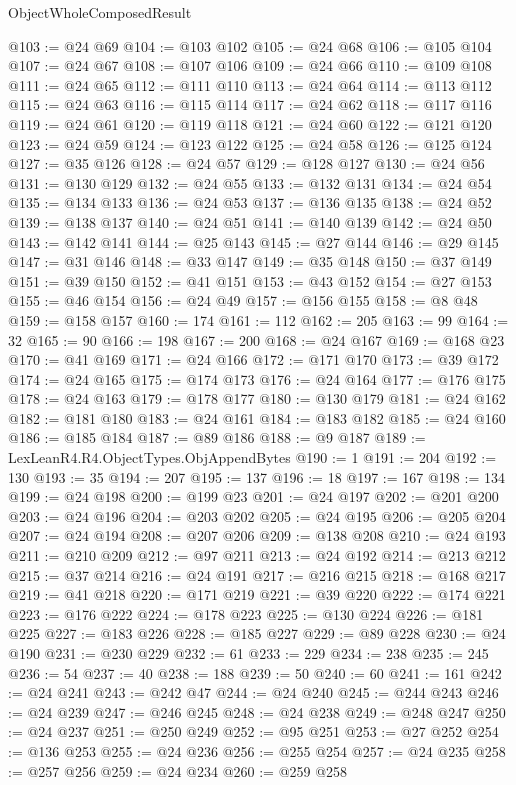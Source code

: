 \begin{lexlean}{ObjectWholeComposedResult}
\begin{coremodule}
@103 := @24 @69
@104 := @103 @102
@105 := @24 @68
@106 := @105 @104
@107 := @24 @67
@108 := @107 @106
@109 := @24 @66
@110 := @109 @108
@111 := @24 @65
@112 := @111 @110
@113 := @24 @64
@114 := @113 @112
@115 := @24 @63
@116 := @115 @114
@117 := @24 @62
@118 := @117 @116
@119 := @24 @61
@120 := @119 @118
@121 := @24 @60
@122 := @121 @120
@123 := @24 @59
@124 := @123 @122
@125 := @24 @58
@126 := @125 @124
@127 := @35 @126
@128 := @24 @57
@129 := @128 @127
@130 := @24 @56
@131 := @130 @129
@132 := @24 @55
@133 := @132 @131
@134 := @24 @54
@135 := @134 @133
@136 := @24 @53
@137 := @136 @135
@138 := @24 @52
@139 := @138 @137
@140 := @24 @51
@141 := @140 @139
@142 := @24 @50
@143 := @142 @141
@144 := @25 @143
@145 := @27 @144
@146 := @29 @145
@147 := @31 @146
@148 := @33 @147
@149 := @35 @148
@150 := @37 @149
@151 := @39 @150
@152 := @41 @151
@153 := @43 @152
@154 := @27 @153
@155 := @46 @154
@156 := @24 @49
@157 := @156 @155
@158 := @8 @48
@159 := @158 @157
@160 := 174
@161 := 112
@162 := 205
@163 := 99
@164 := 32
@165 := 90
@166 := 198
@167 := 200
@168 := @24 @167
@169 := @168 @23
@170 := @41 @169
@171 := @24 @166
@172 := @171 @170
@173 := @39 @172
@174 := @24 @165
@175 := @174 @173
@176 := @24 @164
@177 := @176 @175
@178 := @24 @163
@179 := @178 @177
@180 := @130 @179
@181 := @24 @162
@182 := @181 @180
@183 := @24 @161
@184 := @183 @182
@185 := @24 @160
@186 := @185 @184
@187 := @89 @186
@188 := @9 @187
@189 := LexLeanR4.R4.ObjectTypes.ObjAppendBytes
@190 := 1
@191 := 204
@192 := 130
@193 := 35
@194 := 207
@195 := 137
@196 := 18
@197 := 167
@198 := 134
@199 := @24 @198
@200 := @199 @23
@201 := @24 @197
@202 := @201 @200
@203 := @24 @196
@204 := @203 @202
@205 := @24 @195
@206 := @205 @204
@207 := @24 @194
@208 := @207 @206
@209 := @138 @208
@210 := @24 @193
@211 := @210 @209
@212 := @97 @211
@213 := @24 @192
@214 := @213 @212
@215 := @37 @214
@216 := @24 @191
@217 := @216 @215
@218 := @168 @217
@219 := @41 @218
@220 := @171 @219
@221 := @39 @220
@222 := @174 @221
@223 := @176 @222
@224 := @178 @223
@225 := @130 @224
@226 := @181 @225
@227 := @183 @226
@228 := @185 @227
@229 := @89 @228
@230 := @24 @190
@231 := @230 @229
@232 := 61
@233 := 229
@234 := 238
@235 := 245
@236 := 54
@237 := 40
@238 := 188
@239 := 50
@240 := 60
@241 := 161
@242 := @24 @241
@243 := @242 @47
@244 := @24 @240
@245 := @244 @243
@246 := @24 @239
@247 := @246 @245
@248 := @24 @238
@249 := @248 @247
@250 := @24 @237
@251 := @250 @249
@252 := @95 @251
@253 := @27 @252
@254 := @136 @253
@255 := @24 @236
@256 := @255 @254
@257 := @24 @235
@258 := @257 @256
@259 := @24 @234
@260 := @259 @258

\end{coremodule}
\end{lexlean}
